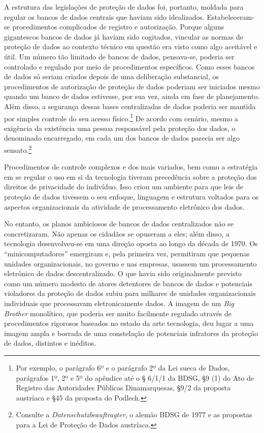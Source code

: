 A estrutura das legislações de proteção de dados foi, portanto, moldada
para regular os bancos de dados centrais que haviam sido idealizados.
Estabeleceram-se procedimentos complicados de registro e autorização.
Porque alguns gigantescos bancos de dados já haviam sido cogitados,
vincular as normas de proteção de dados ao contexto técnico em questão
era visto como algo aceitável e útil. Um número tão limitado de bancos
de dados, pensava-se, poderia ser controlado e regulado por meio de
procedimentos específicos. Como esses bancos de dados só seriam criados
depois de uma deliberação substancial, os procedimentos de autorização
de proteção de dados poderiam ser iniciados mesmo quando um banco de
dados estivesse, por sua vez, ainda em fase de planejamento. Além disso,
a segurança dessas bases centralizadas de dados poderia ser mantida por
simples controle do seu acesso físico.\footnote{Por exemplo, o parágrafo
  6º e o parágrafo 2º da Lei sueca de Dados, parágrafos 1º, 2º e 5º do
  apêndice até o § 6/1/1 da BDSG, §9 (1) do Ato de Registro das
  Autoridades Públicas Dinamarquesas, §9/2 da proposta austríaca e §45
  da proposta do Podlech.} De acordo com cenário, mesmo a exigência da
existência uma pessoa responsável pela proteção dos dados, o denominado
encarregado, em cada um dos bancos de dados parecia ser algo
sensato.\footnote{Consulte a \emph{Datenschutzbeauftragter}, o alemão
  BDSG de 1977 e as propostas para a Lei de Proteção de Dados austríaca.}

Procedimentos de controle complexos e dos mais variados, bem como a
estratégia em se regular o uso em si da tecnologia tiveram precedência
sobre a proteção dos direitos de privacidade do indivíduo. Isso criou um
ambiente para que leis de proteção de dados tivessem o seu enfoque,
linguagem e estrutura voltados para os aspectos organizacionais da
atividade de processamento eletrônico dos dados.

No entanto, os planos ambiciosos de bancos de dados centralizados não se
concretizaram. Não apenas os cidadãos se opuseram a eles; além disso, a
tecnologia desenvolveu-se em uma direção oposta ao longo da década de
1970. Os ``minicomputadores'' emergiram e, pela primeira vez, permitiram
que pequenas unidades organizacionais, no governo e nas empresas,
usassem um processamento eletrônico de dados descentralizado. O que
havia sido originalmente previsto como um número modesto de atores
detentores de bancos de dados e potenciais violadores da proteção de
dados subiu para milhares de unidades organizacionais individuais que
processavam eletronicamente dados. A imagem de um \emph{Big Brother}
monolítico\emph{,} que poderia ser muito facilmente regulado através de
procedimentos rigorosos baseados no estado da arte tecnologia, deu lugar
a uma imagem ampla e borrada de uma constelação de potenciais infratores
da proteção de dados, distintos e inéditos.


